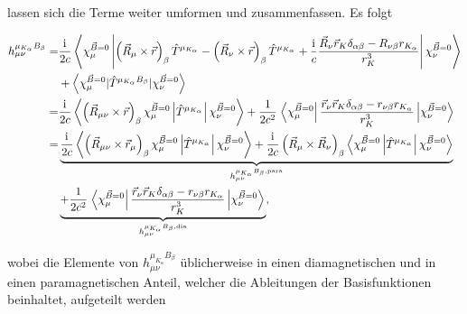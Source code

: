     lassen sich die Terme weiter umformen und zusammenfassen. Es folgt
    
    \begin{equation}
    \begin{aligned}    
    h_{\mu\nu}^{\mu_{K_\alpha}B_\beta}=&\frac{\mathrm{i}\mkern1mu}{2c}\left\langle\chi_\mu^{\vec{B}=0}\left\vert\left(\vec{R}_\mu\times\vec{r}\right)_\beta\hat{T}^{\mu_{K_\alpha}}-\left(\vec{R}_\nu\times\vec{r}\right)_\beta \hat{T}^{\mu_{K_\alpha}}+\frac{\mathrm{i}\mkern1mu}{c}\frac{\vec{R}_\nu\vec{r}_K\delta_{\alpha\beta}-R_{\nu \beta}r_{K_\alpha}}{r_K^3}\right\vert\chi_\nu^{\vec{B}=0}\right\rangle\\
    &+\left\langle\chi_\mu^{\vec{B}=0}\vert\hat{T}^{\mu_{K_\alpha}B_\beta}\vert\chi_\nu^{\vec{B}=0}\right\rangle\\
    =&\frac{\mathrm{i}\mkern1mu}{2c}\left\langle\left(\vec{R}_{\mu\nu}\times\vec{r}\right)_\beta\chi_\mu^{\vec{B}=0}\left\vert\hat{T}^{\mu_{K_\alpha}}\right\vert\chi_\nu^{\vec{B}=0}\right\rangle+\frac{1}{2c^2}\left.\left\langle\chi_\mu^{\vec{B}=0}\right\vert\frac{\vec{r}_\nu\vec{r}_K\delta_{\alpha\beta}-r_{\nu \beta}r_{K_\alpha}}{r_K^3}\left\vert\chi_\nu^{\vec{B}=0}\right\rangle\right.\\
    =&\underbrace{\frac{\mathrm{i}\mkern1mu}{2c}\left\langle\left(\vec{R}_{\mu\nu}\times\vec{r}_\mu\right)_\beta\chi_\mu^{\vec{B}=0}\left\vert\hat{T}^{\mu_{K_\alpha}}\right\vert\chi_\nu^{\vec{B}=0}\right\rangle +\frac{\mathrm{i}\mkern1mu}{2c}\left(\vec{R}_{\mu}\times\vec{R}_\nu\right)_\beta\left\langle\chi_\mu^{\vec{B}=0}\left\vert\hat{T}^{\mu_{K_\alpha}}\right\vert\chi_\nu^{\vec{B}=0}\right\rangle}_{h_{\mu\nu}^{\mu_{K_\alpha}B_\beta,\textrm{para}}} \\
    &\underbrace{+\frac{1}{2c^2}\left.\left\langle\chi_\mu^{\vec{B}=0}\right\vert\frac{\vec{r}_\nu\vec{r}_K\delta_{\alpha\beta}-r_{\nu \beta}r_{K_\alpha}}{r_K^3}\left\vert\chi_\nu^{\vec{B}=0}\right\rangle\right.}_{h_{\mu\nu}^{\mu_{K_\alpha}B_\beta,\textrm{dia}}},
    \end{aligned}
    \end{equation}
     
     wobei die Elemente von $h_{\mu\nu}^{\mu_{K_\alpha}B_\beta}$ üblicherweise in einen diamagnetischen und in einen paramagnetischen Anteil, welcher die Ableitungen der Basisfunktionen beinhaltet, aufgeteilt werden
     
